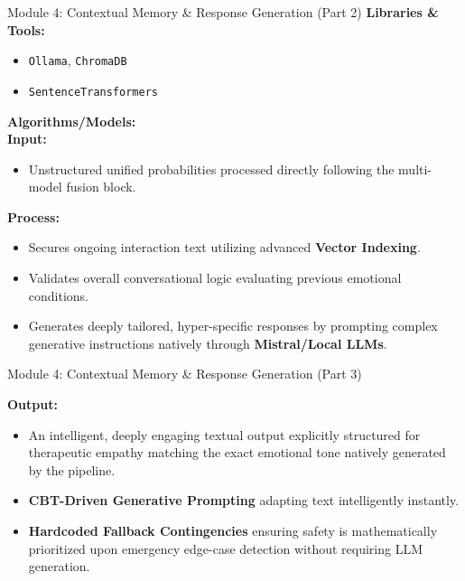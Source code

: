 \documentclass{beamer}
\begin{document}
\begin{frame}{Module 4: Contextual Memory \& Response Generation (Part 2)}
\textbf{Libraries \& Tools:}
\begin{itemize}
    \item \texttt{Ollama}, \texttt{ChromaDB}
    \item \texttt{SentenceTransformers}
\end{itemize}

\vspace{0.3cm}
\textbf{Algorithms/Models:} \\
\textbf{Input:}
\begin{itemize}
    \item Unstructured unified probabilities processed directly following the multi-model fusion block.
\end{itemize}

\textbf{Process:}
\begin{itemize}
    \item Secures ongoing interaction text utilizing advanced \textbf{Vector Indexing}.
    \item Validates overall conversational logic evaluating previous emotional conditions.
    \item Generates deeply tailored, hyper-specific responses by prompting complex generative instructions natively through \textbf{Mistral/Local LLMs}.
\end{itemize}

\end{frame}
\begin{frame}{Module 4: Contextual Memory \& Response Generation (Part 3)}

\textbf{Output:}
\begin{itemize}
    \item An intelligent, deeply engaging textual output explicitly structured for therapeutic empathy matching the exact emotional tone natively generated by the pipeline.
\end{itemize}
\begin{itemize}
    \item \textbf{CBT-Driven Generative Prompting} adapting text intelligently instantly.
    \item \textbf{Hardcoded Fallback Contingencies} ensuring safety is mathematically prioritized upon emergency edge-case detection without requiring LLM generation.
\end{itemize}
\end{frame}
\end{document}
